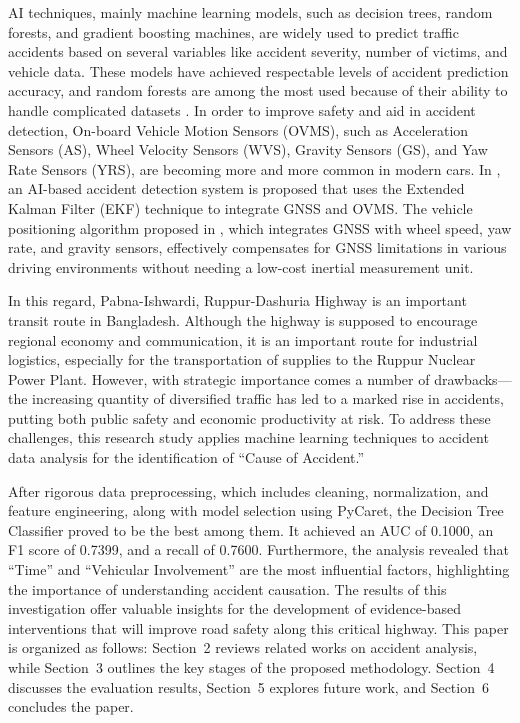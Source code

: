 \documentclass[conference]{IEEEtran}
\begin{document}
AI techniques, mainly machine learning models, such as decision trees, random forests, and gradient boosting machines, are widely used to predict traffic accidents based on several variables like accident severity, number of victims, and vehicle data. These models have achieved respectable levels of accident prediction accuracy, and random forests are among the most used because of their ability to handle complicated datasets \cite{pourroostaei2023road,siswanto2023artificial,nandhiniroad,panda2023predicting}. In order to improve safety and aid in accident detection, On-board Vehicle Motion Sensors (OVMS), such as Acceleration Sensors (AS), Wheel Velocity Sensors (WVS), Gravity Sensors (GS), and Yaw Rate Sensors (YRS), are becoming more and more common in modern cars. In \cite{bahasan2023ai}, an AI-based accident detection system is proposed that uses the Extended Kalman Filter (EKF) technique to integrate GNSS and OVMS. The vehicle positioning algorithm proposed in \cite{han2019performance}, which integrates GNSS with wheel speed, yaw rate, and gravity sensors, effectively compensates for GNSS limitations in various driving environments without needing a low-cost inertial measurement unit. 

In this regard, Pabna-Ishwardi, Ruppur-Dashuria Highway is an important transit route in Bangladesh. Although the highway is supposed to encourage regional economy and communication, it is an important route for industrial logistics, especially for the transportation of supplies to the Ruppur Nuclear Power Plant. However, with strategic importance comes a number of drawbacks—the increasing quantity of diversified traffic has led to a marked rise in accidents, putting both public safety and economic productivity at risk. To address these challenges, this research study applies machine learning techniques to accident data analysis for the identification of ``Cause of Accident.'' 

After rigorous data preprocessing, which includes cleaning, normalization, and feature engineering, along with model selection using PyCaret, the Decision Tree Classifier proved to be the best among them. It achieved an AUC of 0.1000, an F1 score of 0.7399, and a recall of 0.7600. Furthermore, the analysis revealed that ``Time'' and ``Vehicular Involvement'' are the most influential factors, highlighting the importance of understanding accident causation. The results of this investigation offer valuable insights for the development of evidence-based interventions that will improve road safety along this critical highway. This paper is organized as follows: Section~2 reviews related works on accident analysis, while Section~3 outlines the key stages of the proposed methodology. Section~4 discusses the evaluation results, Section~5 explores future work, and Section~6 concludes the paper.
\end{document}
